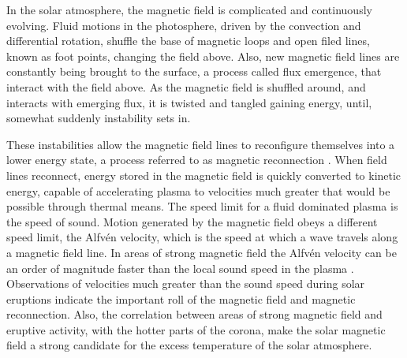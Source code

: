 In the solar atmosphere, the magnetic field is complicated and continuously evolving.
Fluid motions in the photosphere, driven by the convection and differential rotation, shuffle the base of magnetic loops and open filed lines, known as foot points, changing the field above.
Also, new magnetic field lines are constantly being brought to the surface, a process called flux emergence, that interact with the field above.
As the magnetic field is shuffled around, and interacts with emerging flux, it is twisted and tangled gaining energy, until, somewhat suddenly instability sets in.

These instabilities allow the magnetic field lines to reconfigure themselves into a lower energy state, a process referred to as magnetic reconnection \citep{Parker1957,Petschek1964}.
When field lines reconnect, energy stored in the magnetic field is quickly converted to kinetic energy, capable of accelerating plasma to velocities much greater that would be possible through thermal means.
The speed limit for a fluid dominated plasma is the speed of sound.
Motion generated by the magnetic field obeys a different speed limit, the Alfv\' en velocity, which is the speed at which a wave travels along a magnetic field line. 
In areas of strong magnetic field the Alfv\' en velocity can be an order of magnitude faster than the local sound speed in the plasma \citep{Priest2014}.
Observations of velocities much greater than the sound speed during solar eruptions indicate the important roll of the magnetic field and magnetic reconnection.
Also, the correlation between areas of strong magnetic field and eruptive activity, with the hotter parts of the corona, make the solar magnetic field a strong candidate for the excess temperature of the solar atmosphere.


